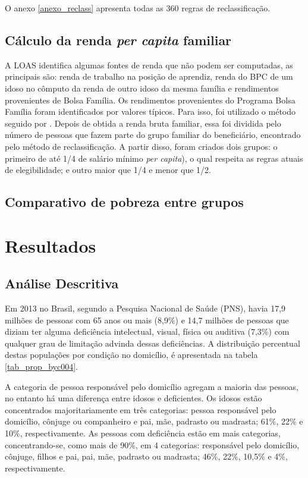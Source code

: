 \documentclass[
	12pt,				%
	openright,			%
	twoside,			%
	a4paper,			%
	english,			%
	french,				%
	spanish,			%
	brazil				%
	]{abntex2}
\begin{document}
	
	O anexo \ref{anexo_reclass} apresenta todas as 360 regras de reclassificação.
	
	\section{Cálculo da renda \textit{per capita} familiar}
	A LOAS identifica algumas fontes de renda que não podem ser computadas, as principais são: renda de trabalho na posição de aprendiz, renda do BPC de um idoso no cômputo da renda de outro idoso da mesma família e rendimentos provenientes de Bolsa Família. Os rendimentos provenientes do Programa Bolsa Família foram identificados por valores típicos. Para isso, foi utilizado o método seguido por \cite{metodologiaOsorio2011}. Depois de obtida a renda bruta familiar, essa foi dividida pelo número de pessoas que fazem parte do grupo familiar do beneficiário, encontrado pelo método de reclassificação. A partir disso, foram criados dois grupos: o primeiro de até 1/4 de salário mínimo \textit{per capita}), o qual respeita as regras atuais de elegibilidade; e outro maior que 1/4 e menor que 1/2.
	
	\section{Comparativo de pobreza entre grupos}

\chapter{Resultados}
\section{Análise Descritiva}
Em 2013 no Brasil, segundo a Pesquisa Nacional de Saúde (PNS), havia 17,9 milhões de pessoas com 65 anos ou mais (8,9\%) e 14,7 milhões de pessoas que diziam ter alguma deficiência intelectual, visual, física ou auditiva (7,3\%) com qualquer grau de limitação advinda dessas deficiências. A distribuição percentual destas populações por condição no domicílio, é apresentada na tabela \ref*{tab_prop_byc004}.

A categoria de pessoa responsável pelo domicílio agregam a maioria das pessoas, no entanto há uma diferença entre idosos e deficientes. Os idosos estão concentrados majoritariamente em três categorias: pessoa responsável pelo domicílio, cônjuge ou companheiro e pai, mãe, padrasto ou madrasta; 61\%, 22\% e 10\%, respectivamente. As pessoas com deficiência estão em mais categorias, concentrando-se, como mais de 90\%, em 4 categorias: responsável pelo domicílio, cônjuge, filhos e pai, pai, mãe, padrasto ou madrasta; 46\%, 22\%, 10,5\% e 4\%, respectivamente.
\end{document}
